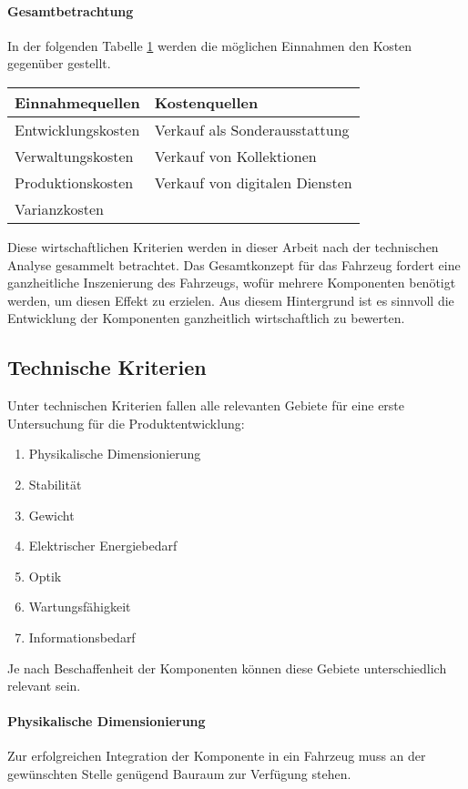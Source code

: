 \paragraph{Gesamtbetrachtung}
In der folgenden Tabelle \ref{tab:Kosten} werden die möglichen Einnahmen den Kosten gegenüber gestellt.
\begin{table}[hbt]	
	\centering
	\renewcommand{\arraystretch}{1.5}	%
	\label{tab:Kosten}
	\begin{tabular}{l|l}
		\textbf{Einnahmequellen} & \textbf{Kostenquellen} \\ 
		\hline
		\hline
		Entwicklungskosten & Verkauf als Sonderausstattung\\
		Verwaltungskosten &  Verkauf von Kollektionen\\
		Produktionskosten & Verkauf von digitalen Diensten\\
		Varianzkosten & \\
	\end{tabular} 
\end{table}
Diese wirtschaftlichen Kriterien werden in dieser Arbeit nach der technischen Analyse gesammelt betrachtet. Das Gesamtkonzept für das Fahrzeug fordert eine ganzheitliche Inszenierung des Fahrzeugs, wofür mehrere Komponenten benötigt werden, um diesen Effekt zu erzielen. Aus diesem Hintergrund ist es sinnvoll die Entwicklung der Komponenten ganzheitlich wirtschaftlich zu bewerten. \\
\subsection{Technische Kriterien}
Unter technischen Kriterien fallen alle relevanten Gebiete für eine erste Untersuchung für die Produktentwicklung:
\begin{enumerate}
	\item Physikalische Dimensionierung
	\item Stabilität
	\item Gewicht
	\item Elektrischer Energiebedarf
	\item Optik
	\item Wartungsfähigkeit
	\item Informationsbedarf
\end{enumerate}
Je nach Beschaffenheit der Komponenten können diese Gebiete unterschiedlich relevant sein.
\paragraph{Physikalische Dimensionierung}
Zur erfolgreichen Integration der Komponente in ein Fahrzeug muss an der gewünschten Stelle genügend Bauraum zur Verfügung stehen.
